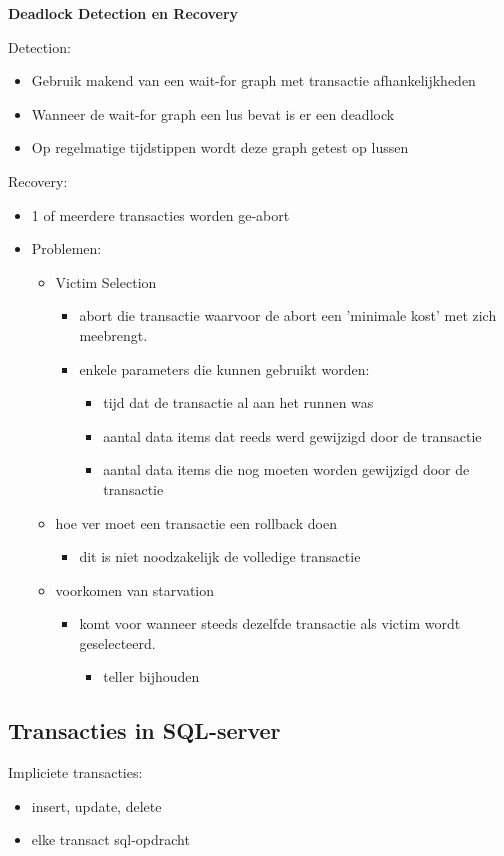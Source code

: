 \documentclass[a4paper,12pt]{article}
\begin{document}
\textbf{Deadlock Detection en Recovery}

Detection:
\begin{itemize}
\item Gebruik makend van een wait-for graph met transactie afhankelijkheden
\item Wanneer de wait-for graph een lus bevat is er een deadlock
\item Op regelmatige tijdstippen wordt deze graph getest op lussen
\end{itemize}
Recovery:
\begin{itemize}
\item 1 of meerdere transacties worden ge-abort
\item Problemen:
	\begin{itemize}
	\item Victim Selection
		\begin{itemize}
		\item abort die transactie waarvoor de abort een 'minimale kost' met zich meebrengt.
		\item enkele parameters die kunnen gebruikt worden:
			\begin{itemize}
			\item tijd dat de transactie al aan het runnen was
			\item aantal data items dat reeds werd gewijzigd door de transactie
			\item aantal data items die nog moeten worden gewijzigd door de transactie
			\end{itemize}
		\end{itemize}
	\item hoe ver moet een transactie een rollback doen
		\begin{itemize}
		\item dit is niet noodzakelijk de volledige transactie
		\end{itemize}
	\item voorkomen van starvation
		\begin{itemize}
		\item komt voor wanneer steeds dezelfde transactie als victim wordt geselecteerd.
			\begin{itemize}
			\item teller bijhouden
			\end{itemize}
		\end{itemize}
	\end{itemize}
\end{itemize}
\subsection{Transacties in SQL-server}
Impliciete transacties:
\begin{itemize}
\item insert, update, delete
\item elke transact sql-opdracht
\end{itemize}
\end{document}
